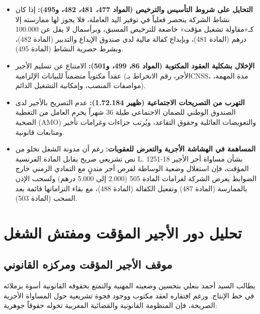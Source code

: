 \begin{itemize}[leftmargin=*, itemsep=5pt]
    \item \textbf{التحايل على شروط التأسيس والترخيص (المواد \textenglish{477}، \textenglish{481}، \textenglish{482}، و\textenglish{495}):} إذا كان نشاط الشركة ينحصر فعلياً في توفير اليد العاملة، فلا يجوز لها ممارسته إلا كـ«مقاولة تشغيل مؤقت» خاضعة للترخيص المسبق، وبرأسمال لا يقل عن \textenglish{100.000} درهم (المادة \textenglish{481})، وبإيداع كفالة مالية لدى صندوق الإيداع والتدبير (المادة \textenglish{482})، وبشرط حصرية النشاط (المادة \textenglish{495}).
    \item \textbf{الإخلال بشكلية العقود المكتوبة (المواد \textenglish{86}، \textenglish{499}، و\textenglish{501}):} الامتناع عن تسليم الأجير عقداً مكتوباً متضمناً للبيانات الإلزامية (الأجر، رقم الانخراط بـ\textenglish{CNSS}، مدة المهمة، مواصفات المنصب، وإمكانية التشغيل الدائم).
    \item \textbf{التهرب من التصريحات الاجتماعية (ظهير \textenglish{1.72.184}):} عدم التصريح بالأجير لدى الصندوق الوطني للضمان الاجتماعي طيلة \textenglish{36} شهراً يحرم العامل من التغطية الصحية (\textenglish{AMO}) والتعويضات العائلية وحقوق التقاعد، ويُرتب جزاءات وغرامات تأخير ومتابعات قانونية.
    \item \textbf{المساهمة في الهشاشة الأجرية والتعرض للعقوبات:} رغم أن مدونة الشغل تخلو من نص تشريعي صريح يقابل المادة الفرنسية \textenglish{L. 1251-18} بشأن مساواة أجر الأجير المؤقت، فإن استغلال وضعية الوساطة لفرض أجر متدنٍ مع التمادي الزمني خارج الضوابط يعرض الشركة لغرامات المادة \textenglish{505} (\textenglish{2.000} إلى \textenglish{5.000} درهم) ولسحب الإذن بالممارسة (المادة \textenglish{487}) وتفعيل الكفالة (المادة \textenglish{488})، مع بقاء التزاماتها قائمة بعد السحب (المادة \textenglish{503}).
\end{itemize}

\section{تحليل دور الأجير المؤقت ومفتش الشغل}

\subsection{موقف الأجير المؤقت ومركزه القانوني}
يطالب السيد أحمد بنعلي بتحسين وضعيته المهنية والتمتع بحقوقه القانونية أسوة بزملائه في خط الإنتاج. ورغم افتقاره لعقد مكتوب ووجود فجوة تشريعية حول المساواة الأجرية الصريحة، فإن المنظومة القانونية والقضائية المغربية تخوله حقوقاً جوهرية:

